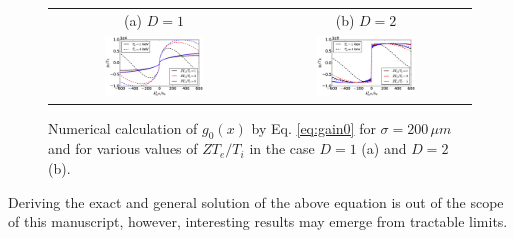 \documentclass[
 reprint,
 amsmath,amssymb,
 aps,
]{revtex4-1}
\begin{document}
\begin{widetext}
 \begin{figure}[!]
\begin{tabular}{cc}
(a) $D=1$ &(b) $D=2$ \\
\includegraphics[width=0.49\textwidth]{int_akin_sin.eps}
 &
\includegraphics[width=0.49\textwidth]{int_akin_sin_D2.eps}
\end{tabular}
\caption{ \label{fig:intakinsin}
Numerical calculation of $g_0(x)$ by Eq. \eqref{eq:gain0} for $\sigma = 200 \,\mu m$ and  for various values of $ZT_e/T_i$ in the case $D=1$ (a) and $D=2$ (b). 
 }
\end{figure}

 \end{widetext}
Deriving the exact and general solution of the above equation is out of the scope of this manuscript, however, interesting results may emerge from tractable limits. 
\end{document}
